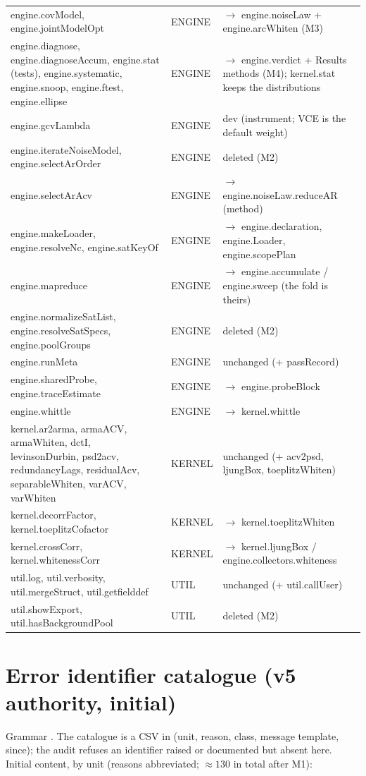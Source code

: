 \begin{longtable}{@{}P{72mm}P{14mm}P{68mm}@{}}
engine.covModel, engine.jointModelOpt & ENGINE & $\to$ engine.noiseLaw + engine.arcWhiten (M3)\\
engine.diagnose, engine.diagnoseAccum, engine.stat (tests), engine.systematic, engine.snoop, engine.ftest, engine.ellipse & ENGINE & $\to$ engine.verdict + Results methods (M4); kernel.stat keeps the distributions\\
engine.gcvLambda & ENGINE & dev (instrument; VCE is the default weight)\\
engine.iterateNoiseModel, engine.selectArOrder & ENGINE & deleted (M2)\\
engine.selectArAcv & ENGINE & $\to$ engine.noiseLaw.reduceAR (method)\\
engine.makeLoader, engine.resolveNc, engine.satKeyOf & ENGINE & $\to$ engine.declaration, engine.Loader, engine.scopePlan\\
engine.mapreduce & ENGINE & $\to$ engine.accumulate / engine.sweep (the fold is theirs)\\
engine.normalizeSatList, engine.resolveSatSpecs, engine.poolGroups & ENGINE & deleted (M2)\\
engine.runMeta & ENGINE & unchanged (+ passRecord)\\
engine.sharedProbe, engine.traceEstimate & ENGINE & $\to$ engine.probeBlock\\
engine.whittle & ENGINE & $\to$ kernel.whittle\\
kernel.ar2arma, armaACV, armaWhiten, dctI, levinsonDurbin, psd2acv, redundancyLags, residualAcv, separableWhiten, varACV, varWhiten & KERNEL & unchanged (+ acv2psd, ljungBox, toeplitzWhiten)\\
kernel.decorrFactor, kernel.toeplitzCofactor & KERNEL & $\to$ kernel.toeplitzWhiten\\
kernel.crossCorr, kernel.whitenessCorr & KERNEL & $\to$ kernel.ljungBox / engine.collectors.whiteness\\
util.log, util.verbosity, util.mergeStruct, util.getfielddef & UTIL & unchanged (+ util.callUser)\\
util.showExport, util.hasBackgroundPool & UTIL & deleted (M2)\\
\bottomrule
\end{longtable}

\chapter{Error identifier catalogue (v5 authority, initial)}
\label{app:ids}

Grammar . The catalogue is a CSV in  (unit, reason, class, message template, since); the audit refuses an identifier raised or documented but absent here. Initial content, by unit (reasons abbreviated; $\approx 130$ in total after M1):


